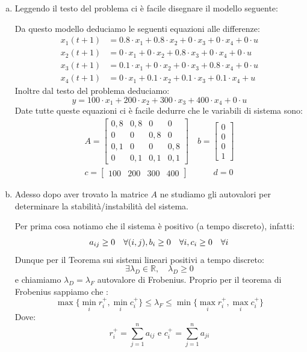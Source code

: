 \documentclass[a4paper]{report}
\newcommand{\R}{\mathbb{R}}%
\begin{document}
\begin{enumerate}[a)]
\item Leggendo il testo del problema ci è facile disegnare il modello seguente:




Da questo modello deduciamo le seguenti equazioni alle differenze:
\begin{align*}
x_1(t+1)&=0.8\cdot x_1+0.8\cdot x_2+ 0\cdot x_3+0\cdot x_4+0\cdot u\\
x_2(t+1)&=0\cdot x_1+0\cdot x_2+ 0.8\cdot x_3+0\cdot x_4+0\cdot u\\
x_3(t+1)&=0.1\cdot x_1+0\cdot x_2+ 0\cdot x_3+0.8\cdot x_4+0\cdot u \\
x_4(t+1)&=0\cdot x_1+0.1\cdot x_2+ 0.1\cdot x_3+0.1\cdot x_4+u
\end{align*}
 Inoltre dal testo del problema deduciamo:
 \[
 y=100\cdot x_1+200\cdot x_2+300\cdot x_3+400\cdot x_4+0\cdot u
 \]
 Date tutte queste equazioni ci è facile dedurre che le variabili di sistema sono:
 \begin{align*}
\boxed{A=\begin{bmatrix}
0,8 & 0,8 & 0& 0\\
0& 0& 0,8& 0\\
0,1& 0& 0& 0,8\\
0 & 0,1 & 0,1& 0,1
\end{bmatrix}} \quad \boxed{b=\begin{bmatrix}
0\\
0\\
0\\
1
\end{bmatrix}}\\
\boxed{c=\begin{bmatrix}
100 &200 &300 &400
\end{bmatrix}}\quad\quad\quad\boxed{d=0}
\end{align*} 
\item Adesso dopo aver trovato la matrice $A$ ne studiamo gli autovalori per determinare la stabilità/instabilità del sistema.
\medskip


Per prima cosa notiamo che il sistema è positivo (a tempo discreto), infatti:
\[
a_{ij}\geq0\quad \forall(i,j),\space b_{i}\geq0\quad \forall i,\space c_{i}\geq0\quad \forall i
\]
Dunque per il Teorema sui sistemi lineari positivi a tempo discreto:
\[\exists \lambda_D\in\R, \quad\lambda_D\geq 0\]
e chiamiamo $\lambda_D=\lambda_F$ autovalore di Frobenius. Proprio per il teorema di Frobenius sappiamo che :
\[
\max \{ \min_i r_i^+,\min_ic^+_i \} \leq \lambda_F\leq \min\{\max_i r_i^+,\max_ic^+_i\}
\]
Dove:
\[
r^+_i=\sum^n_{j=1} a_{ij} \text{ e }c^+_i=\sum^n_{j=1} a_{ji}
\]


\end{enumerate}
\end{document}
